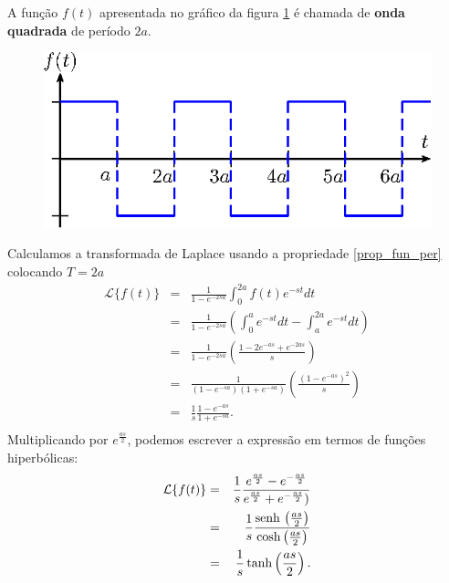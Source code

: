 \begin{ex}{\label{ex_onda_quadrada}}A função $f(t)$ apresentada no gráfico da figura \ref{fig_onda_quadrada} é chamada de {\bf onda quadrada} de período $2a$.
 \begin{figure}[!ht]
\begin{center}

\includegraphics{cap_especiais_coef_var/pics/figura_1}\end{center}
\caption{\label{fig_onda_quadrada}}
\end{figure}
Calculamos a transformada de Laplace usando a propriedade \ref{prop_fun_per} colocando $T=2a$
\begin{eqnarray*}
\mathcal{L}\{f(t)\}&=& \frac{1}{1-e^{-2sa}}\int_0^{2a}f(t)e^{-st}dt\\
&=& \frac{1}{1-e^{-2sa}}\left(\int_0^{a}e^{-st}dt-\int_a^{2a}e^{-st}dt\right)\\
&=& \frac{1}{1-e^{-2sa}}\left(\frac{1-2e^{-as}+e^{-2as}}{s}\right)\\
&=& \frac{1}{(1-e^{-sa})(1+e^{-sa})}\left(\frac{(1-e^{-as})^2}{s}\right)\\
&=&\frac{1}{s} \frac{1-e^{-as}}{1+e^{-sa}}.\\
\end{eqnarray*}
Multiplicando por $e^{\frac{as}{2}}$, podemos escrever a expressão em termos de funções hiperbólicas:
\begin{eqnarray*}
\mathcal{L}\{f(t)\}&=&\frac{1}{s} \frac{e^{\frac{as}{2}}-e^{-\frac{as}{2}}}{e^{\frac{as}{2}}+e^{-\frac{as}{2}})}\\
&=&\frac{1}{s} \frac{\operatorname{senh}\,\left(\frac{as}{2}\right)}{\cosh\left(\frac{as}{2}\right)}\\
&=&\frac{1}{s} \tanh\left(\frac{as}{2}\right).
\end{eqnarray*}
\end{ex}
